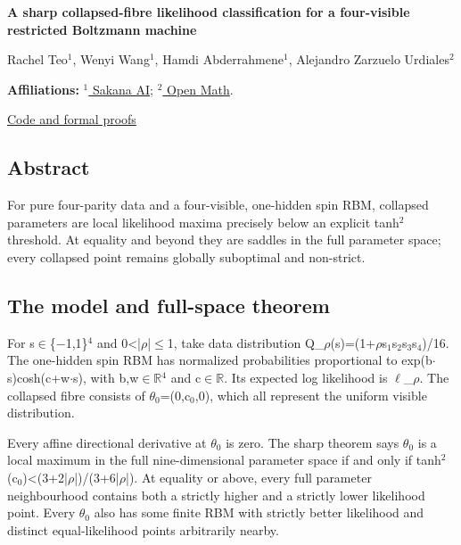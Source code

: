 \documentclass[11pt,a4paper]{article}
\begin{document}
{\LARGE\bfseries A sharp collapsed-fibre likelihood classification for a four-visible restricted Boltzmann machine\par}\medskip
{\small Rachel Teo\ensuremath{^1}, Wenyi Wang\ensuremath{^1}, Hamdi Abderrahmene\ensuremath{^1}, Alejandro Zarzuelo Urdiales\ensuremath{^2}\par}\medskip
{\small\textbf{Affiliations:} \href{https://sakana.ai/}{\ensuremath{^1} Sakana AI}; \href{https://rsihouse.ai/openmath}{\ensuremath{^2} Open Math}.\par}

{\small\href{https://github.com/alejandrozu/openmath-2026-judging}{Code and formal proofs}\par}

\subsection{Abstract}
For pure four-parity data and a four-visible, one-hidden spin RBM, collapsed parameters are local likelihood maxima precisely below an explicit tanh\ensuremath{^2} threshold. At equality and beyond they are saddles in the full parameter space; every collapsed point remains globally suboptimal and non-strict.

\subsection{The model and full-space theorem}
For s\ensuremath{\in}\{\ensuremath{-}1,1\}\ensuremath{^4} and 0<|\ensuremath{\rho}|\ensuremath{\leq}1, take data distribution Q\_\ensuremath{\rho}(s)=(1+\ensuremath{\rho}s\ensuremath{_1}s\ensuremath{_2}s\ensuremath{_3}s\ensuremath{_4})/16. The one-hidden spin RBM has normalized probabilities proportional to exp(b\ensuremath{\cdot}s)cosh(c+w\ensuremath{\cdot}s), with b,w\ensuremath{\in}\ensuremath{\mathbb{R}}\ensuremath{^4} and c\ensuremath{\in}\ensuremath{\mathbb{R}}. Its expected log likelihood is \ensuremath{\ell}\_\ensuremath{\rho}. The collapsed fibre consists of \ensuremath{\theta}\ensuremath{_0}=(0,c\ensuremath{_0},0), which all represent the uniform visible distribution.

Every affine directional derivative at \ensuremath{\theta}\ensuremath{_0} is zero. The sharp theorem says \ensuremath{\theta}\ensuremath{_0} is a local maximum in the full nine-dimensional parameter space if and only if tanh\ensuremath{^2}(c\ensuremath{_0})<(3+2|\ensuremath{\rho}|)/(3+6|\ensuremath{\rho}|). At equality or above, every full parameter neighbourhood contains both a strictly higher and a strictly lower likelihood point. Every \ensuremath{\theta}\ensuremath{_0} also has some finite RBM with strictly better likelihood and distinct equal-likelihood points arbitrarily nearby.
\end{document}
